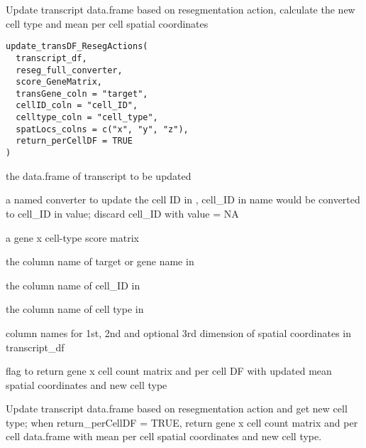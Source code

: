 \documentclass[letterpaper]{book}
\begin{document}
%
\begin{Description}
Update transcript data.frame based on resegmentation action, calculate the new cell type and mean per cell spatial coordinates
\end{Description}
%
\begin{Usage}
\begin{verbatim}
update_transDF_ResegActions(
  transcript_df,
  reseg_full_converter,
  score_GeneMatrix,
  transGene_coln = "target",
  cellID_coln = "cell_ID",
  celltype_coln = "cell_type",
  spatLocs_colns = c("x", "y", "z"),
  return_perCellDF = TRUE
)
\end{verbatim}
\end{Usage}
%
\begin{Arguments}
\begin{ldescription}
\item[\code{transcript\_df}] the data.frame of transcript to be updated

\item[\code{reseg\_full\_converter}] a named converter to update the cell ID in , cell\_ID in name would be converted to cell\_ID in value; discard cell\_ID with value = NA

\item[\code{score\_GeneMatrix}] a gene x cell-type score matrix

\item[\code{transGene\_coln}] the column name of target or gene name in 

\item[\code{cellID\_coln}] the column name of cell\_ID in 

\item[\code{celltype\_coln}] the column name of cell type in 

\item[\code{spatLocs\_colns}] column names for 1st, 2nd and optional 3rd dimension of spatial coordinates in transcript\_df

\item[\code{return\_perCellDF}] flag to return gene x cell count matrix and per cell DF with updated mean spatial coordinates and new cell type
\end{ldescription}
\end{Arguments}
%
\begin{Details}
Update transcript data.frame based on resegmentation action and get new cell type; when return\_perCellDF = TRUE, return gene x cell count matrix and per cell data.frame with mean per cell spatial coordinates and new cell type.
\end{Details}
\end{document}
